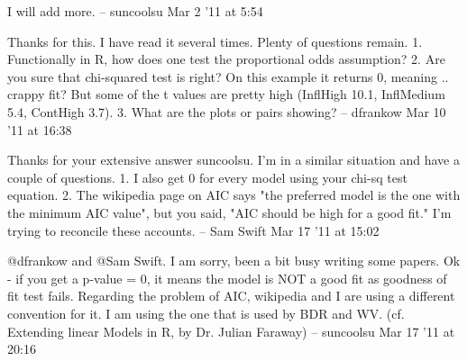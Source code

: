 I will add more. –  suncoolsu Mar 2 '11 at 5:54
  	 	
Thanks for this. I have read it several times. Plenty of questions remain. 1. Functionally in R, how does one test the proportional odds assumption? 2. Are you sure that chi-squared test is right? On this example it returns 0, meaning .. crappy fit? But some of the t values are pretty high (InflHigh 10.1, InflMedium 5.4, ContHigh 3.7). 3. What are the plots or pairs showing? –  dfrankow Mar 10 '11 at 16:38
  	 	
Thanks for your extensive answer suncoolsu. I'm in a similar situation and have a couple of questions. 1. I also get 0 for every model using your chi-sq test equation. 2. The wikipedia page on AIC says "the preferred model is the one with the minimum AIC value", but you said, "AIC should be high for a good fit." I'm trying to reconcile these accounts. –  Sam Swift Mar 17 '11 at 15:02
  	 	
@dfrankow and @Sam Swift. I am sorry, been a bit busy writing some papers. Ok - if you get a p-value = 0, it means the model is NOT a good fit as goodness of fit test fails. Regarding the problem of AIC, wikipedia and I are using a different convention for it. I am using the one that is used by BDR and WV. (cf. Extending linear Models in R, by Dr. Julian Faraway) –  suncoolsu Mar 17 '11 at 20:16
